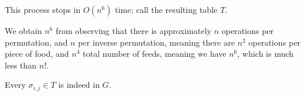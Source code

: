 \begin{claim}
    This process stops in $O(n^6)$ time; call the resulting table $T$.
\end{claim}
\noindent We obtain $n^6$ from observing that there is approximately $n$ operations per permutation, and $n$ per inverse permutation, meaning there are $n^2$ operations per piece of food, and $n^4$ total number of feeds, meaning we have $n^6$, which is much less than $n!$.
\begin{claim}
    Every $\sigma_{i, j} \in T$ is indeed in $G$.
\end{claim}